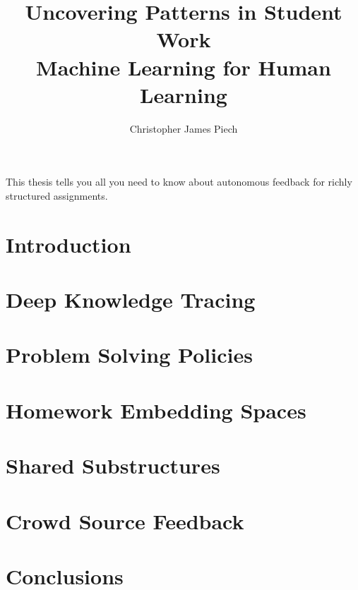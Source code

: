\documentclass{report}
\begin{document}
\title{Uncovering Patterns in Student Work\\
            Machine Learning for Human Learning}
\author{Christopher James Piech}
 
\beforepreface
{}
This thesis tells you all you need to know about autonomous feedback for richly structured assignments.


\afterpreface

\chapter{Introduction}


\chapter{Deep Knowledge Tracing}


\chapter{Problem Solving Policies}


\chapter{Homework Embedding Spaces}


\chapter{Shared Substructures}


\chapter{Crowd Source Feedback}


\chapter{Conclusions}



 
\end{document}
